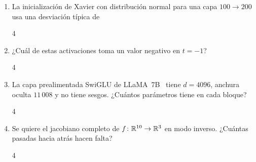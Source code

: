 \begin{enumerate}[label=\textbf{\arabic*.},leftmargin=2em,itemsep=8pt,ref=\arabic*]
\item\label{q:11}  La inicialización de Xavier con distribución normal para una capa $100\to 200$ usa una desviación típica de
\begin{multicols}{4}
\end{multicols}

\item\label{q:12}  ¿Cuál de estas activaciones toma un valor negativo en $t=-1$?
\begin{multicols}{4}
\end{multicols}

\item\label{q:13}  La capa prealimentada SwiGLU de LLaMA~7B~\cite{llama} tiene $d=4096$, anchura oculta $11\,008$ y no tiene sesgos. ¿Cuántos parámetros tiene en cada bloque?
\begin{multicols}{4}
\end{multicols}

\item\label{q:14}  Se quiere el jacobiano completo de $f\colon\mathbb{R}^{10}\to\mathbb{R}^{3}$ en modo inverso. ¿Cuántas pasadas hacia atrás hacen falta?
\begin{multicols}{4}
\end{multicols}


\end{enumerate}
